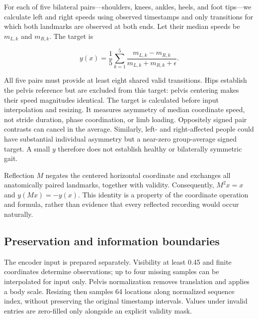 \documentclass{article}
\begin{document}
For each of five bilateral pairs---shoulders, knees, ankles, heels, and foot tips---we calculate left and right speeds using observed timestamps and only transitions for which both landmarks are observed at both ends. Let their median speeds be \(m_{L,k}\) and \(m_{R,k}\). The target is

\[
y(x)=\frac{1}{5}\sum_{k=1}^{5}
\frac{m_{L,k}-m_{R,k}}{m_{L,k}+m_{R,k}+\epsilon}.
\]

All five pairs must provide at least eight shared valid transitions. Hips establish the pelvis reference but are excluded from this target: pelvis centering makes their speed magnitudes identical. The target is calculated before input interpolation and resizing. It measures asymmetry of median coordinate speed, not stride duration, phase coordination, or limb loading. Oppositely signed pair contrasts can cancel in the average. Similarly, left- and right-affected people could have substantial individual asymmetry but a near-zero group-average signed target. A small \(y\) therefore does not establish healthy or bilaterally symmetric gait.

Reflection \(M\) negates the centered horizontal coordinate and exchanges all anatomically paired landmarks, together with validity. Consequently, \(M^2x=x\) and \(y(Mx)=-y(x)\). This identity is a property of the coordinate operation and formula, rather than evidence that every reflected recording would occur naturally.

\subsection{Preservation and information boundaries}\label{preservation-and-information-boundaries}

The encoder input is prepared separately. Visibility at least 0.45 and finite coordinates determine observations; up to four missing samples can be interpolated for input only. Pelvis normalization removes translation and applies a body scale. Resizing then samples 64 locations along normalized sequence index, without preserving the original timestamp intervals. Values under invalid entries are zero-filled only alongside an explicit validity mask.
\end{document}
